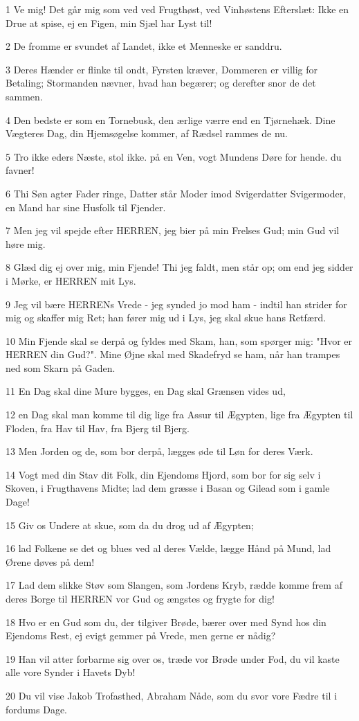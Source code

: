 \par 1 Ve mig! Det går mig som ved ved Frugthøst, ved Vinhøstens Efterslæt: Ikke en Drue at spise, ej en Figen, min Sjæl har Lyst til!
\par 2 De fromme er svundet af Landet, ikke et Menneske er sanddru.
\par 3 Deres Hænder er flinke til ondt, Fyrsten kræver, Dommeren er villig for Betaling; Stormanden nævner, hvad han begærer; og derefter snor de det sammen.
\par 4 Den bedste er som en Tornebusk, den ærlige værre end en Tjørnehæk. Dine Vægteres Dag, din Hjemsøgelse kommer, af Rædsel rammes de nu.
\par 5 Tro ikke eders Næste, stol ikke. på en Ven, vogt Mundens Døre for hende. du favner!
\par 6 Thi Søn agter Fader ringe, Datter står Moder imod Svigerdatter Svigermoder, en Mand har sine Husfolk til Fjender.
\par 7 Men jeg vil spejde efter HERREN, jeg bier på min Frelses Gud; min Gud vil høre mig.
\par 8 Glæd dig ej over mig, min Fjende! Thi jeg faldt, men står op; om end jeg sidder i Mørke, er HERREN mit Lys.
\par 9 Jeg vil bære HERRENs Vrede - jeg synded jo mod ham - indtil han strider for mig og skaffer mig Ret; han fører mig ud i Lys, jeg skal skue hans Retfærd.
\par 10 Min Fjende skal se derpå og fyldes med Skam, han, som spørger mig: "Hvor er HERREN din Gud?". Mine Øjne skal med Skadefryd se ham, når han trampes ned som Skarn på Gaden.
\par 11 En Dag skal dine Mure bygges, en Dag skal Grænsen vides ud,
\par 12 en Dag skal man komme til dig lige fra Assur til Ægypten, lige fra Ægypten til Floden, fra Hav til Hav, fra Bjerg til Bjerg.
\par 13 Men Jorden og de, som bor derpå, lægges øde til Løn for deres Værk.
\par 14 Vogt med din Stav dit Folk, din Ejendoms Hjord, som bor for sig selv i Skoven, i Frugthavens Midte; lad dem græsse i Basan og Gilead som i gamle Dage!
\par 15 Giv os Undere at skue, som da du drog ud af Ægypten;
\par 16 lad Folkene se det og blues ved al deres Vælde, lægge Hånd på Mund, lad Ørene døves på dem!
\par 17 Lad dem slikke Støv som Slangen, som Jordens Kryb, rædde komme frem af deres Borge til HERREN vor Gud og ængstes og frygte for dig!
\par 18 Hvo er en Gud som du, der tilgiver Brøde, bærer over med Synd hos din Ejendoms Rest, ej evigt gemmer på Vrede, men gerne er nådig?
\par 19 Han vil atter forbarme sig over os, træde vor Brøde under Fod, du vil kaste alle vore Synder i Havets Dyb!
\par 20 Du vil vise Jakob Trofasthed, Abraham Nåde, som du svor vore Fædre til i fordums Dage.



